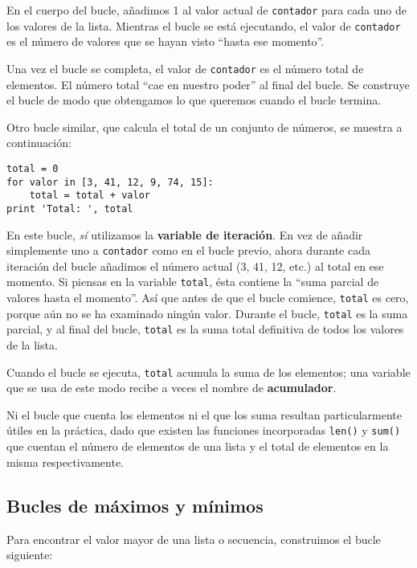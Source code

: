 En el cuerpo del bucle, añadimos 1 al valor actual de {\tt contador}
para cada uno de los valores de la lista. Mientras el bucle se está ejecutando, el
valor de {\tt contador} es el número de valores que se hayan visto ``hasta ese momento''.

Una vez el bucle se completa, el valor de {\tt contador} es el número total
de elementos. El número total ``cae en nuestro poder'' al final del
bucle. Se construye el bucle de modo que obtengamos lo que queremos cuando el
bucle termina.

Otro bucle similar, que calcula el total de un conjunto de números,
se muestra a continuación:

\beforeverb
\begin{verbatim}
total = 0
for valor in [3, 41, 12, 9, 74, 15]:
    total = total + valor
print 'Total: ', total
\end{verbatim}
\afterverb
%
En este bucle, \emph{sí} utilizamos la {\bf variable de iteración}.
En vez de añadir simplemente uno a {\tt contador} como en el bucle previo,
ahora durante cada iteración del bucle añadimos el número actual (3, 41, 12, etc.)
al total en ese momento.
Si piensas en la variable {\tt total}, ésta contiene la
``suma parcial de valores hasta el momento''. Así que antes de que el bucle
comience, {\tt total} es cero, porque aún no se ha examinado ningún valor.
Durante el bucle, {\tt total} es la suma parcial, y al final del bucle,
{\tt total} es la suma total definitiva de todos los valores
de la lista.

Cuando el bucle se ejecuta, {\tt total} acumula la suma de los elementos;
una variable que se usa de este modo recibe a veces el nombre de
{\bf acumulador}.

Ni el bucle que cuenta los elementos ni el que los suma resultan particularmente
útiles en la práctica, dado que existen las funciones incorporadas
{\tt len()} y {\tt sum()} que cuentan el número de elementos
de una lista y el total de elementos en la misma
respectivamente.

\subsection{Bucles de máximos y mínimos}

\label{maximumloop}
Para encontrar el valor mayor de una lista o secuencia, construimos
el bucle siguiente:

